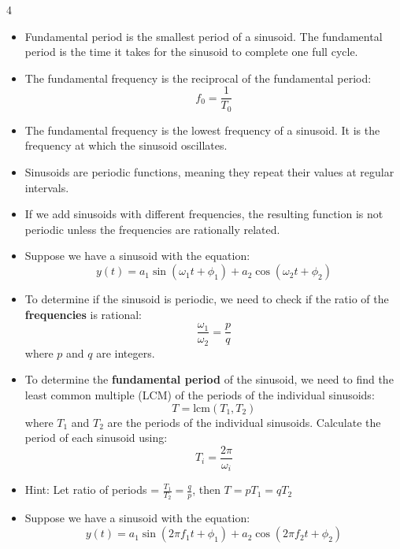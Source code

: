 \documentclass[10pt, landscape]{article}
\begin{document}
\begin{multicols*}{4}
  \begin{itemize}
    \item Fundamental period is the smallest period of a sinusoid. The fundamental period is the time it takes for the sinusoid to complete one full cycle.
    \item The fundamental frequency is the reciprocal of the fundamental period:
    \begin{equation}
      f_0 = \frac{1}{T_0}
    \end{equation}
    \item The fundamental frequency is the lowest frequency of a sinusoid. It is the frequency at which the sinusoid oscillates.
    \item Sinusoids are periodic functions, meaning they repeat their values at regular intervals. 
    \item If we add sinusoids with different frequencies, the resulting function is not periodic unless the frequencies are rationally related.
    \item Suppose we have a sinusoid with the equation:
     \begin{equation}
      y(t) = a_1 \sin(\omega_1 t + \phi_1) + a_2 \cos(\omega_2 t + \phi_2)
    \end{equation}
    \item To determine if the sinusoid is periodic, we need to check if the ratio of the \textbf{frequencies} is rational:
    \begin{equation}
      \frac{\omega_1}{\omega_2} = \frac{p}{q}
    \end{equation}
    where $p$ and $q$ are integers.
    \item To determine the \textbf{fundamental period} of the sinusoid, we need to find the least common multiple (LCM) of the periods of the individual sinusoids:
    \begin{equation}
      T = \text{lcm}(T_1, T_2)
    \end{equation}
    where $T_1$ and $T_2$ are the periods of the individual sinusoids. Calculate the period of each sinusoid using:
    \begin{equation}
      T_i = \frac{2\pi}{\omega_i}
    \end{equation}
    \item Hint: Let ratio of periods = $ \frac{T_1}{T_2} = \frac{q}{p}$, then $T = p T_1 = q T_2 $
    \item Suppose we have a sinusoid with the equation:
     \begin{equation}
      y(t) = a_1 \sin(2 \pi f_1 t + \phi_1) + a_2 \cos(2 \pi f_2 t + \phi_2)

\end{equation}
\end{itemize}
\end{multicols*}
\end{document}
